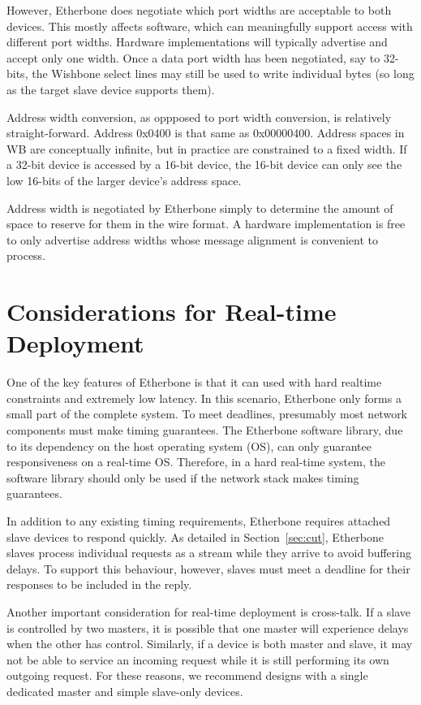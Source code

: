 \documentclass{article}
\begin{document}
However, 
Etherbone does negotiate which port widths are acceptable to both devices.
This mostly affects software,
which can meaningfully support access with different port widths.
Hardware implementations will typically advertise and accept only one width.
Once a data port width has been negotiated, say to 32-bits, 
the Wishbone select lines may still be used to write individual bytes
(so long as the target slave device supports them). 

Address width conversion, as oppposed to port width conversion,
is relatively straight-forward.
Address 0x0400 is that same as 0x00000400.
Address spaces in WB are conceptually infinite, 
but in practice are constrained to a fixed width.
If a 32-bit device is accessed by a 16-bit device,
the 16-bit device can only see the low 16-bits of the larger device's address space.

Address width is negotiated by Etherbone simply to determine the amount of
space to reserve for them in the wire format.
A hardware implementation is free to only advertise address widths
whose message alignment is convenient to process.

\section{Considerations for Real-time Deployment}
\label{sec:deployment}

One of the key features of Etherbone is that it can used with hard realtime constraints
and extremely low latency.
In this scenario, Etherbone only forms a small part of the complete system.
To meet deadlines, presumably most network components must make timing guarantees.
The Etherbone software library, 
due to its dependency on the host operating system (OS),
can only guarantee responsiveness on a real-time OS.
Therefore, in a hard real-time system,
the software library should only be used if the network stack 
makes timing guarantees.

In addition to any existing timing requirements, 
Etherbone requires attached slave devices to respond quickly.
As detailed in Section~\ref{sec:cut},
Etherbone slaves process individual requests as a stream while they arrive
to avoid buffering delays.
To support this behaviour, however, 
slaves must meet a deadline 
for their responses to be included in the reply.

Another important consideration for real-time deployment is cross-talk.
If a slave is controlled by two masters, 
it is possible that one master will experience delays when the other has control.
Similarly, if a device is both master and slave,
it may not be able to service an incoming request while it is still
performing its own outgoing request.
For these reasons, 
we recommend designs with a single dedicated master and simple slave-only devices.
\end{document}
